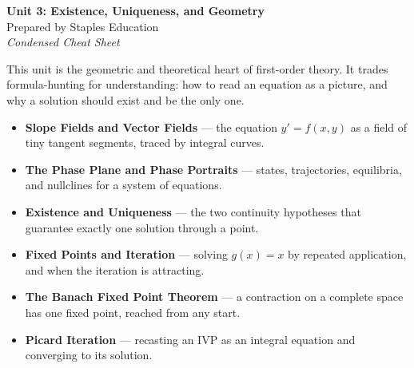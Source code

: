 




\begin{center}
    {\LARGE \bfseries Unit 3: Existence, Uniqueness, and Geometry}\\[6pt]
    {\large Prepared by Staples Education}\\[4pt]
    {\itshape Condensed Cheat Sheet}
\end{center}

\vspace{0.4em}

\begin{topicsbox}
This unit is the geometric and theoretical heart of first-order theory. It
trades formula-hunting for understanding: how to read an equation as a picture,
and why a solution should exist and be the only one.
\begin{itemize}[leftmargin=1.4em, itemsep=3pt]
    \item \textbf{Slope Fields and Vector Fields} --- the equation
          $y' = f(x,y)$ as a field of tiny tangent segments, traced by integral
          curves.
    \item \textbf{The Phase Plane and Phase Portraits} --- states, trajectories,
          equilibria, and nullclines for a system of equations.
    \item \textbf{Existence and Uniqueness} --- the two continuity hypotheses
          that guarantee exactly one solution through a point.
    \item \textbf{Fixed Points and Iteration} --- solving $g(x)=x$ by repeated
          application, and when the iteration is attracting.
    \item \textbf{The Banach Fixed Point Theorem} --- a contraction on a
          complete space has one fixed point, reached from any start.
    \item \textbf{Picard Iteration} --- recasting an IVP as an integral
          equation and converging to its solution.
\end{itemize}
\end{topicsbox}


